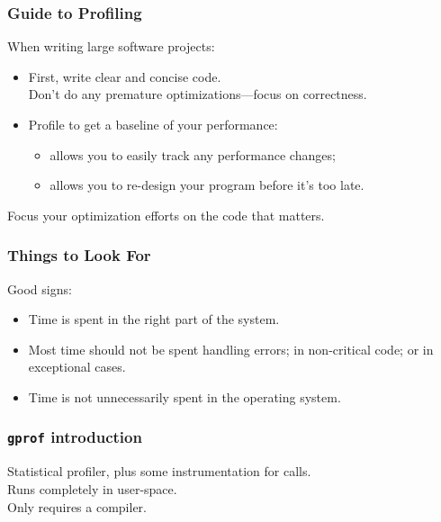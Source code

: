 \documentclass[aspectratio=43]{beamer}
\newenvironment{changemargin}[1]{%
  \begin{list}{}{%
    \setlength{\topsep}{0pt}%
    \setlength{\leftmargin}{#1}%
    \setlength{\rightmargin}{1em}
    \setlength{\listparindent}{\parindent}%
    \setlength{\itemindent}{\parindent}%
    \setlength{\parsep}{\parskip}%
  }%
  \item[]}{\end{list}}
\begin{document}
\begin{frame}
  \frametitle{Guide to Profiling}

  \begin{changemargin}{1cm}
  When writing large software projects:
  \begin{itemize}
    \item First, write clear and concise code. \\
      Don't do any premature optimizations---focus on correctness.
    \item Profile to get a baseline of your performance:
      \begin{itemize}
        \item allows you to easily track any performance changes;
        \item allows you to re-design your program before it's too late.
      \end{itemize}
  \end{itemize}
  Focus your optimization efforts on the code that matters.
  \end{changemargin}
\end{frame}

\begin{frame}
  \frametitle{Things to Look For}

  \begin{changemargin}{1.5cm}
    Good signs:

    \begin{itemize}
      \item Time is spent in the right part of the system.
      \item Most time should not be spent handling errors; in
      non-critical code; or in exceptional cases.
      \item Time is not unnecessarily spent in the operating system.
    \end{itemize}
  \end{changemargin}
\end{frame}

\begin{frame}
  \frametitle{{\tt gprof} introduction}

  \begin{changemargin}{2cm}
    Statistical profiler, plus some instrumentation for calls.\\[1em]
    Runs completely in user-space.\\[1em]
    Only requires a compiler.
  \end{changemargin}
\end{frame}
\end{document}
